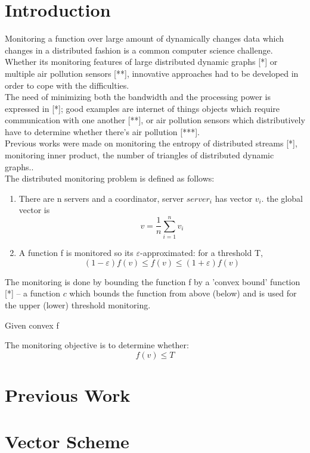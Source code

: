 \documentclass[10pt, conference]{IEEEtran}
\begin{document}
\section{Introduction}
Monitoring a function over large amount of dynamically changes data which changes in a distributed fashion is a common computer science challenge. Whether its monitoring features of large distributed dynamic graphs [*] or multiple air pollution sensors [**], innovative approaches had to be developed in order to cope with the difficulties. \\
The need of minimizing both the bandwidth and the processing power is expressed in [*]; good examples are internet of things objects which require communication with one another [**], or air pollution sensors which distributively have to determine whether there's air pollution [***]. \\
Previous works were made on monitoring the entropy of distributed streams [*], monitoring inner product, the number of triangles of distributed dynamic graphs.. \\
The distributed monitoring problem is defined as follows:
\begin{enumerate}
\item There are n servers and a coordinator, server $server_i$ has vector $v_i$. the global vector is $$v = \frac{1}{n}\sum\limits_{i=1}^n {v_i}$$
\item A function f is monitored so its $\varepsilon$-approximated: for a threshold T, $$(1-\varepsilon )f(v) \leq f(v) \leq (1+\varepsilon )f(v)$$
\end{enumerate}
The monitoring is done by bounding the function f by a 'convex bound' function [*] -- a function $c$ which bounds the function from above (below) and is used for the upper (lower) threshold monitoring.

Given convex f \label{fConvexity}

The monitoring objective is to determine whether:
\begin{equation}
\label{monitoringConstraint}
f(v) \leq T
\end{equation}


\section{Previous Work}

\section{Vector Scheme}
\end{document}
